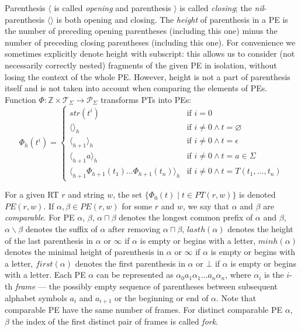 \documentclass[AMA,STIX1COL]{WileyNJD-v2}
\newcommand{\Xl}{\langle}
\newcommand{\Xr}{\rangle}
\newcommand{\Xm}{\langle\!\rangle}
\newcommand{\XP}{\mathcal{P}}
\newcommand{\XT}{\mathcal{T}}
\newcommand{\YZ}{\mathbb{Z}}
\begin{document}
Parenthesis $\Xl$ is called \emph{opening} and
parenthesis $\Xr$ is called \emph{closing};
the \emph{nil}-parenthesis $\Xm$ is both opening and closing.
The \emph{height} of parenthesis in a PE is the number of preceding opening parentheses (including this one)
minus the number of preceding closing parentheses (including this one).
For convenience we sometimes explicitly denote height with subscript:
this allows us to consider (not necessarily correctly nested) fragments of the given PE in isolation,
without losing the context of the whole PE.
However, height is not a part of parenthesis itself
and is not taken into account when comparing the elements of PEs.
Function $\Phi : \YZ \times \XT_\Sigma \rightarrow \XP_\Sigma$ transforms PTs into PEs:
    $$
    \Phi_{h}(t^{i}) = \begin{cases}
        str(t^{i})                                            &\text{if } i = 0 \\
        \Xm_h                                                 &\text{if } i \neq 0 \wedge t = \varnothing \\
        \Xl_{h+1} \Xr_h                                       &\text{if } i \neq 0 \wedge t = \epsilon \\
        \Xl_{h+1} a \Xr_h                                     &\text{if } i \neq 0 \wedge t = a \in \Sigma \\
        \Xl_{h+1} \Phi_{h+1}(t_1) \dots \Phi_{h+1}(t_n) \Xr_h &\text{if } i \neq 0 \wedge t = T(t_1, \dots, t_n)
    \end{cases}
    $$

For a given RT $r$ and string $w$, the set $\big\{ \Phi_{0}(t) \mid t \in PT(r, w) \big\}$ is denoted $PE(r, w)$.
If $\alpha, \beta \in PE(r, w)$ for some $r$ and $w$, we say that $\alpha$ and $\beta$ are \emph{comparable}.
%
For PE $\alpha$, $\beta$,
$\alpha \sqcap \beta$ denotes the longest common prefix of $\alpha$ and $\beta$,
$\alpha \backslash \beta$ denotes the suffix of $\alpha$ after removing $\alpha \sqcap \beta$,
$lasth(\alpha)$ denotes the height of the last parenthesis in $\alpha$ or $\infty$ if $\alpha$ is empty or begins with a letter,
$minh(\alpha)$ denotes the minimal height of parenthesis in $\alpha$ or $\infty$ if $\alpha$ is empty or begins with a letter,
$first(\alpha)$ denotes the first parenthesis in $\alpha$ or $\bot$ if $\alpha$ is empty or begins with a letter.
Each PE $\alpha$ can be represented as $\alpha_0 a_1 \alpha_1 \dots a_n \alpha_n$,
where $\alpha_i$ is the $i$-th \emph{frame} --- the possibly empty sequence of parentheses between
subsequent alphabet symbols $a_i$ and $a_{i+1}$ or the beginning or end of $\alpha$.
Note that comparable PE have the same number of frames.
For distinct comparable PE $\alpha$, $\beta$
the index of the first distinct pair of frames is called \emph{fork}.
\end{document}
